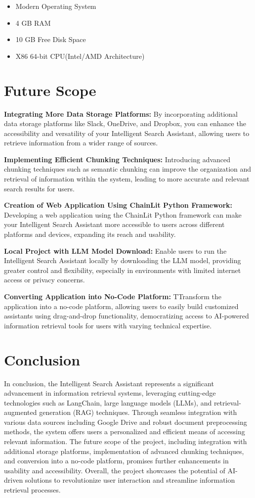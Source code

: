 \documentclass[12pt,a4paper,oneside]{report}
\begin{document}
\begin{itemize}
\item{Modern Operating System}
\item{4 GB RAM}
\item{10 GB Free Disk Space}
\item{X86 64-bit CPU(Intel/AMD Architecture)}
\end{itemize}




\newpage
\chapter{Future Scope}
\textbf{    Integrating More Data Storage Platforms:} By incorporating additional data storage platforms like Slack, OneDrive, and Dropbox, you can enhance the accessibility and versatility of your Intelligent Search Assistant, allowing users to retrieve information from a wider range of sources.

\textbf{Implementing Efficient Chunking Techniques:} Introducing advanced chunking techniques such as semantic chunking can improve the organization and retrieval of information within the system, leading to more accurate and relevant search results for users.


\textbf{Creation of Web Application Using ChainLit Python Framework:} Developing a web application using the ChainLit Python framework can make your Intelligent Search Assistant more accessible to users across different platforms and devices, expanding its reach and usability.

\textbf{Local Project with LLM Model Download:} Enable users to run the Intelligent Search Assistant locally by downloading the LLM model, providing greater control and flexibility, especially in environments with limited internet access or privacy concerns.

\textbf{Converting Application into No-Code Platform:} TTransform the application into a no-code platform, allowing users to easily build customized assistants using drag-and-drop functionality, democratizing access to AI-powered information retrieval tools for users with varying technical expertise.
\newpage
\chapter{Conclusion}
\hspace{20pt}In conclusion, the Intelligent Search Assistant represents a significant advancement in information retrieval systems, leveraging cutting-edge technologies such as LangChain, large language models (LLMs), and retrieval-augmented generation (RAG) techniques. Through seamless integration with various data sources including Google Drive and robust document preprocessing methods, the system offers users a personalized and efficient means of accessing relevant information. The future scope of the project, including integration with additional storage platforms, implementation of advanced chunking techniques, and conversion into a no-code platform, promises further enhancements in usability and accessibility. Overall, the project showcases the potential of AI-driven solutions to revolutionize user interaction and streamline information retrieval processes.
\end{document}
